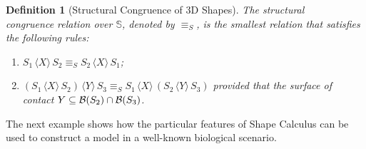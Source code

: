 \documentclass[11pt]{article}
\newcommand{\shapes}{\mathbb{S}}
\newcommand{\union}[1]{\ensuremath{\,\langle #1 \rangle\,}}
\newcommand{\boundary}[1]{\ensuremath{{\cal B}(#1)}}
\newtheorem{definition}{Definition}
\begin{document}
\begin{definition}[Structural Congruence of 3D Shapes]
\label{def:shapecongruence}
The structural \\ congruence relation over $\shapes$, denoted by $\equiv_S$, is the smallest relation that satisfies the following rules:
\begin{enumerate}
\item $S_1 \union{X} S_2 \equiv_S S_2 \union{X} S_1$;
\item $(S_1 \union{X} S_2) \union{Y} S_3 \equiv_S S_1 \union{X} (S_2 \union{Y} S_3)$ provided that
the surface of contact $Y \subseteq \boundary{S_2} \cap \boundary{S_3}$.
\end{enumerate}
\end{definition}

The next example shows how the particular features of Shape Calculus can be used to construct a model in a well-known biological scenario.
\end{document}

